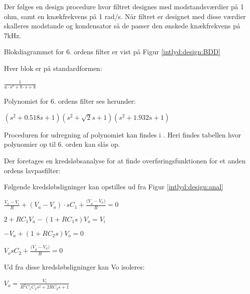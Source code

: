 
Der følges en design procedure hvor filtret designes med modstandsværdier på 1 ohm, samt en knækfrekvens på 1 rad/s. Når filtret er designet med disse værdier skalleres modstande og kondensator så de passer den ønskede knækfrekvens på 7kHz. 

Blokdiagrammet for 6. ordens filter er vist på Figur \ref{intlyd:design:BDD}


Hver blok er på standardformen:
\begin{center}
$\frac { 1 }{ { a\cdot s }^{ 2 }+b\cdot s+k }$ 
\end{center}

Polynomiet for 6. ordens filter ses herunder:
\begin{center}
$({ s }^{ 2 }+0.518s+1)({ s }^{ 2 }+\sqrt { 2 } s+1)({ s }^{ 2 }+1.932s+1)$
\end{center}

Proceduren for udregning af polynomiet kan findes i \citep{filter_calc}. Heri findes tabellen hvor polynomier op til 6. orden kan slås op. 

Der foretages en kredsløbsanalyse for at finde overføringsfunktionen for et anden ordens lavpasfilter:


Følgende kredsløbsligninger kan opstilles ud fra Figur \ref{intlyd:design:anal}
\begin{center}
$\frac { { V }_{ a }-{ V }_{ i } }{ R } +({ V }_{ a }-{ V }_{ o })\cdot s{ C }_{ 1 }+\frac { { (V }_{ a }-{ V }_{ o }) }{ R } =0$

$2+R{ C }_{ 1 }{ V }_{ a }-(1+R{ C }_{ 1 }s){ V }_{ o }={ V }_{ i }$

$-{ V }_{ a }+(1+R{ C }_{ 2 }s){ V }_{ o }=0$

${ V }_{ o }s{ C }_{ 2 }+\frac { { (V }_{ 0 }-{ V }_{ a }) }{ R } =0$
\end{center}

Ud fra disse kredsløbsligninger kan Vo isoleres: 
\begin{center}
${ V }_{ o }=\frac { { V }_{ i } }{ { R }^{ 2 }{ C }_{ 1 }{ C }_{ 2 }{ s }^{ 2 }+2R{ C }_{ 2 }s+1 }$
\end{center}

